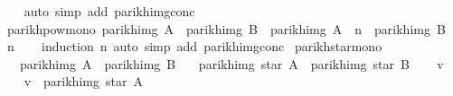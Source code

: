 \begin{isabellebody}
%
\isadelimproof
\ \ %
\endisadelimproof
%
\isatagproof
{}\isamarkupfalse%
\ {\isacharparenleft}{\kern0pt}auto\ simp\ add{\isacharcolon}{\kern0pt}\ parikh{\isacharunderscore}{\kern0pt}img{\isacharunderscore}{\kern0pt}conc{\isacharparenright}{\kern0pt}%
\endisatagproof
{\isafoldproof}%
%
\isadelimproof
\isanewline
%
\endisadelimproof
\isanewline
{}\isamarkupfalse%
\ parikh{\isacharunderscore}{\kern0pt}pow{\isacharunderscore}{\kern0pt}mono{\isacharcolon}{\kern0pt}\ {\isachardoublequoteopen}parikh{\isacharunderscore}{\kern0pt}img\ A\ {\isasymsubseteq}\ parikh{\isacharunderscore}{\kern0pt}img\ B\ {\isasymLongrightarrow}\ parikh{\isacharunderscore}{\kern0pt}img\ {\isacharparenleft}{\kern0pt}A\ {\isacharcircum}{\kern0pt}{\isacharcircum}{\kern0pt}\ n{\isacharparenright}{\kern0pt}\ {\isasymsubseteq}\ parikh{\isacharunderscore}{\kern0pt}img\ {\isacharparenleft}{\kern0pt}B\ {\isacharcircum}{\kern0pt}{\isacharcircum}{\kern0pt}\ n{\isacharparenright}{\kern0pt}{\isachardoublequoteclose}\isanewline
%
\isadelimproof
\ \ %
\endisadelimproof
%
\isatagproof
{}\isamarkupfalse%
\ {\isacharparenleft}{\kern0pt}induction\ n{\isacharparenright}{\kern0pt}\ {\isacharparenleft}{\kern0pt}auto\ simp\ add{\isacharcolon}{\kern0pt}\ parikh{\isacharunderscore}{\kern0pt}img{\isacharunderscore}{\kern0pt}conc{\isacharparenright}{\kern0pt}%
\endisatagproof
{\isafoldproof}%
%
\isadelimproof
\isanewline
%
\endisadelimproof
\isanewline
{}\isamarkupfalse%
\ parikh{\isacharunderscore}{\kern0pt}star{\isacharunderscore}{\kern0pt}mono{\isacharcolon}{\kern0pt}\isanewline
\ \ \ {\isachardoublequoteopen}parikh{\isacharunderscore}{\kern0pt}img\ A\ {\isasymsubseteq}\ parikh{\isacharunderscore}{\kern0pt}img\ B{\isachardoublequoteclose}\isanewline
\ \ \ {\isachardoublequoteopen}parikh{\isacharunderscore}{\kern0pt}img\ {\isacharparenleft}{\kern0pt}star\ A{\isacharparenright}{\kern0pt}\ {\isasymsubseteq}\ parikh{\isacharunderscore}{\kern0pt}img\ {\isacharparenleft}{\kern0pt}star\ B{\isacharparenright}{\kern0pt}{\isachardoublequoteclose}\isanewline
%
\isadelimproof
%
\endisadelimproof
%
\isatagproof
{}\isamarkupfalse%
\isanewline
\ \ \isamarkupfalse%
\ v\isanewline
\ \ \isamarkupfalse%
\ {\isachardoublequoteopen}v\ {\isasymin}\ parikh{\isacharunderscore}{\kern0pt}img\ {\isacharparenleft}{\kern0pt}star\ A{\isacharparenright}{\kern0pt}{\isachardoublequoteclose}\isanewline
\ \ \isamarkupfalse%
\ \isamarkupfalse%

\end{isabellebody}
